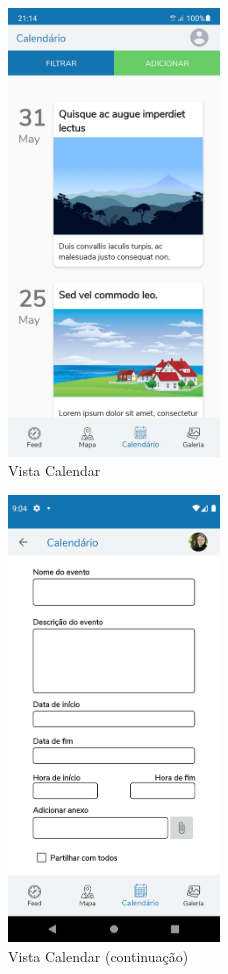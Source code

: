 \documentclass[12pt]{report}
\begin{document}
\begin{itemize}
    \bigskip
    \begin{figure}[H]
        \centering
        \includegraphics[width=0.5\textwidth]{view-calendar-1.png}
        \caption{Vista Calendar}
    \end{figure}
    
    \bigskip
    \begin{figure}[H]
        \centering
        \includegraphics[width=0.5\textwidth]{view-calendar-2.png}
        \caption{Vista Calendar (continuação)}
    \end{figure}


\end{itemize}
\end{document}
